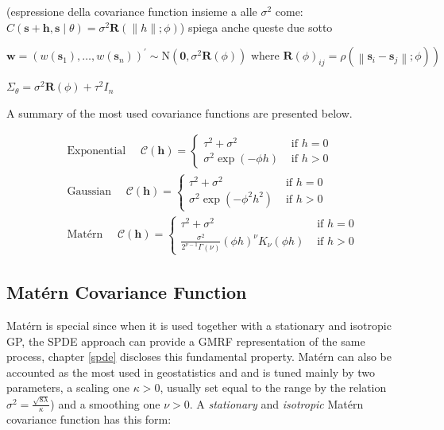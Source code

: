 \documentclass[
  12pt,
  a4paper,
  oneside]{book}
\begin{document}
(espressione della covariance function insieme a alle \(\sigma^2\) come: \(C(\mathbf{s}+\mathbf{h}, \mathbf{s} \mid \theta)=\sigma^{2} \mathbf{R}(\|h\| ; \phi)\))
spiega anche queste due sotto

\[
\mathbf{w}=\left(w\left(\mathbf{s}_{1}\right), \ldots, w\left(\mathbf{s}_{n}\right)\right)^{\prime} \sim \mathrm{N}\left(\mathbf{0}, \sigma^{2} \mathbf{R}(\phi)\right) \text { where } \left.\mathbf{R}(\phi)_{i j}=\rho\left(\left\|\mathbf{s}_{i}-\mathbf{s}_{j}\right\| ; \phi\right)\right)
\]

\(\Sigma_{\theta}=\sigma^{2} \mathbf{R}(\phi)+\tau^{2} I_{n}\)

A summary of the most used covariance functions are presented below.

\[
\begin{aligned}
&\text { Exponential } \quad \mathcal{C}(\mathbf{h})=\left\{\begin{array}{cl}
\tau^{2}+\sigma^{2} & \text { if }  h=0 \\
\sigma^{2} \exp (-\phi h) & \text { if } h>0 
\end{array}\right.\\
&\text { Gaussian } \quad \mathcal{C}(\mathbf{h})=\left\{\begin{array}{cl}
\tau^{2}+\sigma^{2} & \text { if } h=0 \\
\sigma^{2} \exp \left(-\phi^{2} h^{2}\right) & \text { if } h>0 
\end{array}\right. \\
&\text { Matérn } \quad \mathcal{C}(\mathbf{h})=\left\{\begin{array}{cl}
\tau^{2}+\sigma^{2} & \text { if } h=0 \\
\frac{\sigma^{2}}{2^{\nu-1} \Gamma(\nu)}(\phi h)^{\nu} K_{\nu}(\phi h) & \text { if } h>0
\end{array}\right.
\end{aligned}
\]

\hypertarget{Matern}{%
\subsection{Matérn Covariance Function}\label{Matern}}

Matérn is special since when it is used together with a stationary and isotropic GP, the SPDE approach can provide a GMRF representation of the same process, chapter \ref{spde} discloses this fundamental property.
Matérn can also be accounted as the most used in geostatistics \citep{Krainski2018} and \citep{Bayesian_INLA_Rubio} and is tuned mainly by two parameters, a scaling one \(\kappa>0\), usually set equal to the range by the relation \(\sigma^{2}=\frac{\sqrt{8 \lambda}}{\kappa}\)) and a smoothing one \(\nu>0\). A \emph{stationary} and \emph{isotropic} Matérn covariance function has this form:
\end{document}
